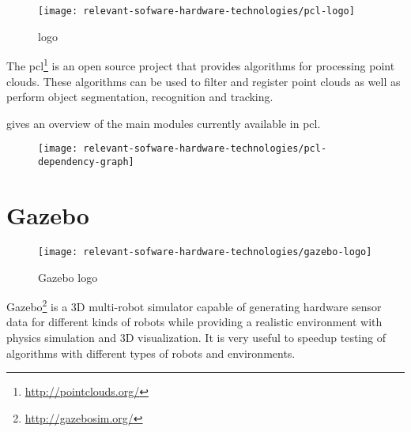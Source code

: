 \section{}

\begin{wrapfigure}{r}{0.25\textwidth}
	\centering
	\texttt{[image: relevant-sofware-hardware-technologies/pcl-logo]}
	\caption{ logo}
	\label{fig:relevant-sofware-hardware-technologies_pcl-logo}
\end{wrapfigure}

The \gls{pcl}\footnote{\url{http://pointclouds.org/}} \cite{Rusu2011} is an open source project that provides algorithms for processing point clouds. These algorithms can be used to filter and register point clouds as well as perform object segmentation, recognition and tracking.

 gives an overview of the main modules currently available in \gls{pcl}.

\begin{figure}[H]
	\centering
	\texttt{[image: relevant-sofware-hardware-technologies/pcl-dependency-graph]}
	\caption[]{\protect\footnotemark}
	\label{fig:relevant-sofware-hardware-technologies_pcl-dependency-graph}
\end{figure}

\clearpage



\section{Gazebo}

\begin{wrapfigure}{r}{0.25\textwidth}
	\centering
	\texttt{[image: relevant-sofware-hardware-technologies/gazebo-logo]}
	\caption{Gazebo logo}
	\label{fig:relevant-sofware-hardware-technologies_gazebo-logo}
\end{wrapfigure}


Gazebo\footnote{\url{http://gazebosim.org/}} is a 3D multi-robot simulator capable of generating hardware sensor data for different kinds of robots while providing a realistic environment with physics simulation and 3D visualization. It is very useful to speedup testing of algorithms with different types of robots and environments.

